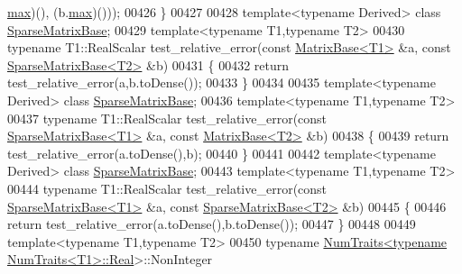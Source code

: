 \begin{DoxyCode}
      \hyperlink{group___geometry___module_ad10b1fa3021f705e3104d09b8842c37e}{max})(), (b.\hyperlink{group___geometry___module_ad10b1fa3021f705e3104d09b8842c37e}{max})()));
00426 \}
00427 
00428 \textcolor{keyword}{template}<\textcolor{keyword}{typename} Derived> \textcolor{keyword}{class }\hyperlink{group___sparse_core___module_class_eigen_1_1_sparse_matrix_base}{SparseMatrixBase};
00429 \textcolor{keyword}{template}<\textcolor{keyword}{typename} T1,\textcolor{keyword}{typename} T2>
00430 \textcolor{keyword}{typename} T1::RealScalar test\_relative\_error(\textcolor{keyword}{const} \hyperlink{group___core___module_class_eigen_1_1_matrix_base}{MatrixBase<T1>} &a, \textcolor{keyword}{const} 
      \hyperlink{group___sparse_core___module_class_eigen_1_1_sparse_matrix_base}{SparseMatrixBase<T2>} &b)
00431 \{
00432   \textcolor{keywordflow}{return} test\_relative\_error(a,b.toDense());
00433 \}
00434 
00435 \textcolor{keyword}{template}<\textcolor{keyword}{typename} Derived> \textcolor{keyword}{class }\hyperlink{group___sparse_core___module_class_eigen_1_1_sparse_matrix_base}{SparseMatrixBase};
00436 \textcolor{keyword}{template}<\textcolor{keyword}{typename} T1,\textcolor{keyword}{typename} T2>
00437 \textcolor{keyword}{typename} T1::RealScalar test\_relative\_error(\textcolor{keyword}{const} \hyperlink{group___sparse_core___module_class_eigen_1_1_sparse_matrix_base}{SparseMatrixBase<T1>} &a, \textcolor{keyword}{const} 
      \hyperlink{group___core___module_class_eigen_1_1_matrix_base}{MatrixBase<T2>} &b)
00438 \{
00439   \textcolor{keywordflow}{return} test\_relative\_error(a.toDense(),b);
00440 \}
00441 
00442 \textcolor{keyword}{template}<\textcolor{keyword}{typename} Derived> \textcolor{keyword}{class }\hyperlink{group___sparse_core___module_class_eigen_1_1_sparse_matrix_base}{SparseMatrixBase};
00443 \textcolor{keyword}{template}<\textcolor{keyword}{typename} T1,\textcolor{keyword}{typename} T2>
00444 \textcolor{keyword}{typename} T1::RealScalar test\_relative\_error(\textcolor{keyword}{const} \hyperlink{group___sparse_core___module_class_eigen_1_1_sparse_matrix_base}{SparseMatrixBase<T1>} &a, \textcolor{keyword}{const} 
      \hyperlink{group___sparse_core___module_class_eigen_1_1_sparse_matrix_base}{SparseMatrixBase<T2>} &b)
00445 \{
00446   \textcolor{keywordflow}{return} test\_relative\_error(a.toDense(),b.toDense());
00447 \}
00448 
00449 \textcolor{keyword}{template}<\textcolor{keyword}{typename} T1,\textcolor{keyword}{typename} T2>
00450 \textcolor{keyword}{typename} \hyperlink{group___core___module_struct_eigen_1_1_num_traits}{NumTraits<typename NumTraits<T1>::Real}>::NonInteger 

\end{DoxyCode}
